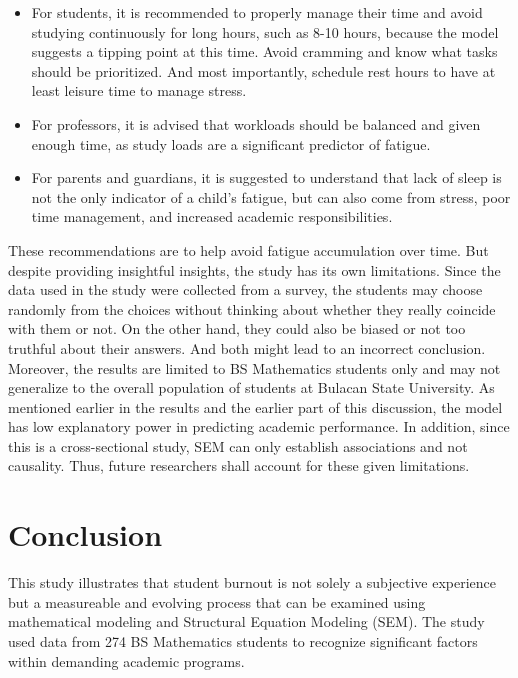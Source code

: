 \documentclass [12pt]{article}
\begin{document}
\begin{itemize}
    \item For students, it is recommended to properly manage their time and avoid studying continuously for long hours, such as 8-10 hours, because the model suggests a tipping point at this time. Avoid cramming and know what tasks should be prioritized. And most importantly, schedule rest hours to have at least leisure time to manage stress. 
    \item For professors, it is advised that workloads should be balanced and given enough time, as study loads are a significant predictor of fatigue. 
    \item For parents and guardians, it is suggested to understand that lack of sleep is not the only indicator of a child’s fatigue, but can also come from stress, poor time management, and increased academic responsibilities. 
\end{itemize}

These recommendations are to help avoid fatigue accumulation over time. But despite providing insightful insights, the study has its own limitations. Since the data used in the study were collected from a survey, the students may choose randomly from the choices without thinking about whether they really coincide with them or not. On the other hand, they could also be biased or not too truthful about their answers. And both might lead to an incorrect conclusion. Moreover, the results are limited to BS Mathematics students only and may not generalize to the overall population of students at Bulacan State University. As mentioned earlier in the results and the earlier part of this discussion, the model has low explanatory power in predicting academic performance. In addition, since this is a cross-sectional study, SEM can only establish associations and not causality. Thus, future researchers shall account for these given limitations. 

\newpage
\section*{Conclusion}

This study illustrates that student burnout is not solely a subjective experience but a measureable and evolving process that can be examined using mathematical modeling and Structural Equation Modeling (SEM). The study used data from 274 BS Mathematics students to recognize significant factors within demanding academic programs.
\end{document}
